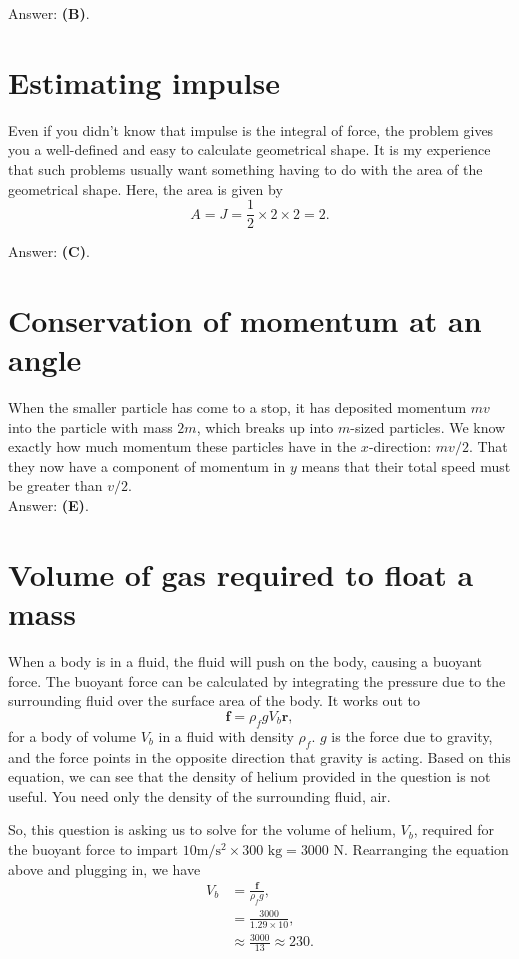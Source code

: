 \documentclass[11pt]{paper}
\newcommand{\answer}[1]{Answer: \textbf{(#1)}.}
\begin{document}
\answer{B}


\section{Estimating impulse}
Even if you didn't know that impulse is the integral of force, the problem gives you a well-defined and easy to calculate geometrical shape.  It is my experience that such problems usually want something having to do with the area of the geometrical shape.  Here, the area is given by
\begin{equation}
A = J = \frac{1}{2}\times2\times2 = 2.
\end{equation}

\answer{C}

\section{Conservation of momentum at an angle}
When the smaller particle has come to a stop, it has deposited momentum $mv$ into the particle with mass $2m$, which breaks up into $m$-sized particles.  We know exactly how much momentum these particles have in the $x$-direction: $mv/2$.  That they now have a component of momentum in $y$ means that their total speed must be greater than $v/2$.\\

\answer{E}

\section{Volume of gas required to float a mass}
When a body is in a fluid, the fluid will push on the body, causing a buoyant force.  The buoyant force can be calculated by integrating the pressure due to the surrounding fluid over the surface area of the body.  It works out to
\begin{equation}
\mathbf{f} = \rho_f g V_b \mathbf{\hat{r}},
\end{equation}
for a body of volume $V_b$ in a fluid with density $\rho_f$.  $g$ is the force due to gravity, and the force points in the opposite direction that gravity is acting.  Based on this equation, we can see that the density of helium provided in the question is not useful.  You need only the density of the surrounding fluid, air.

So, this question is asking us to solve for the volume of helium, $V_b$, required for the buoyant force to impart $10\text{m}/\text{s}^2 \times 300 \text{ kg} = 3000 \text{ N}$.  Rearranging the equation above and plugging in, we have
\begin{align}
V_b &= \frac{\mathbf{f}}{\rho_f g},\\
&= \frac{3000}{1.29 \times 10},\\
&\approx \frac{3000}{13} \approx 230.\\
\end{align}
\end{document}
